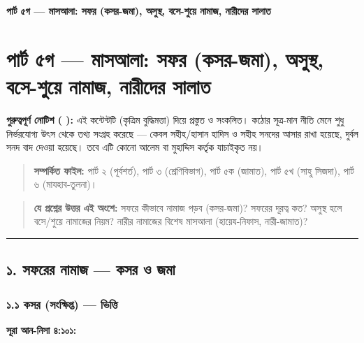 

\begin{center}{\Large\bfseries\color{emerald} পার্ট ৫গ — মাসআলা: সফর (কসর-জমা), অসুস্থ, বসে-শুয়ে নামাজ, নারীদের সালাত}\end{center}
\vspace{1em}
\section*{পার্ট ৫গ — মাসআলা: সফর (কসর-জমা), অসুস্থ, বসে-শুয়ে নামাজ, নারীদের সালাত}

\begin{warnbox}
 \textbf{গুরুত্বপূর্ণ নোটিশ ( ):} এই কন্টেন্টটি  (কৃত্রিম বুদ্ধিমত্তা) দিয়ে প্রস্তুত ও সংকলিত।  কঠোর সূত্র-মান নীতি মেনে শুধু নির্ভরযোগ্য উৎস থেকে তথ্য সংগ্রহ করেছে — কেবল সহীহ/হাসান হাদিস ও সহীহ সনদের আসার রাখা হয়েছে, দুর্বল সনদ বাদ দেওয়া হয়েছে। তবে এটি কোনো আলেম বা মুহাদ্দিস কর্তৃক যাচাইকৃত নয়।
\end{warnbox}

\begin{quote}
\textbf{সম্পর্কিত ফাইল:} পার্ট ২ (পূর্বশর্ত), পার্ট ৩ (শ্রেণিবিভাগ), পার্ট ৫ক (জামাত), পার্ট ৫খ (সাহু সিজদা), পার্ট ৬ (মাযহাব-তুলনা)।
\end{quote}

\begin{quote}
\textbf{যে প্রশ্নের উত্তর এই অংশে:} সফরে কীভাবে নামাজ পড়ব (কসর-জমা)? সফরের দূরত্ব কত? অসুস্থ হলে বসে/শুয়ে নামাজের নিয়ম? নারীর নামাজের বিশেষ মাসআলা (হায়েয-নিফাস, নারী-জামাত)?
\end{quote}

\medskip\hrule\medskip

\subsection*{১. সফরের নামাজ — কসর ও জমা}

\subsubsection*{১.১ কসর (সংক্ষিপ্ত) — ভিত্তি}

\textbf{সূরা আন-নিসা ৪:১০১:}

\begin{center}\end{center}


